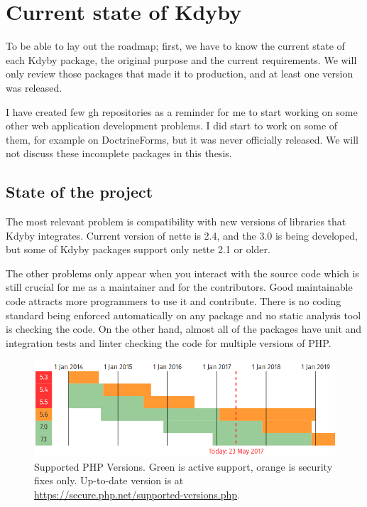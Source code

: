 \chapter{Current state of Kdyby}

To be able to lay out the roadmap; first, we have to know the current state of each Kdyby package, the original purpose and the current requirements. We will only review those packages that made it to production, and at least one version was released.

I have created few \gls{gh} repositories as a reminder for me to start working on some other web application development problems. I did start to work on some of them, for example on DoctrineForms, but it was never officially released. We will not discuss these incomplete packages in this thesis.

\section{State of the project}

The most relevant problem is compatibility with new versions of libraries that Kdyby integrates. Current version of \gls{nette} is 2.4, and the 3.0 is being developed, but some of Kdyby packages support only \gls{nette} 2.1 or older.

The other problems only appear when you interact with the source code which is still crucial for me as a maintainer and for the contributors. Good maintainable code attracts more programmers to use it and contribute. There is no coding standard being enforced automatically on any package and no static analysis tool is checking the code. On the other hand, almost all of the packages have unit and integration tests and linter checking the code for multiple versions of PHP.

\begin{figure} \label{fig:php:supported-versions}
  \centering
    \includegraphics[width=1\textwidth]{src/assets/php-supported-versions.png}
  \caption{Supported PHP Versions. Green is active support, orange is security fixes only. Up-to-date version is at \url{https://secure.php.net/supported-versions.php}.}
\end{figure}

